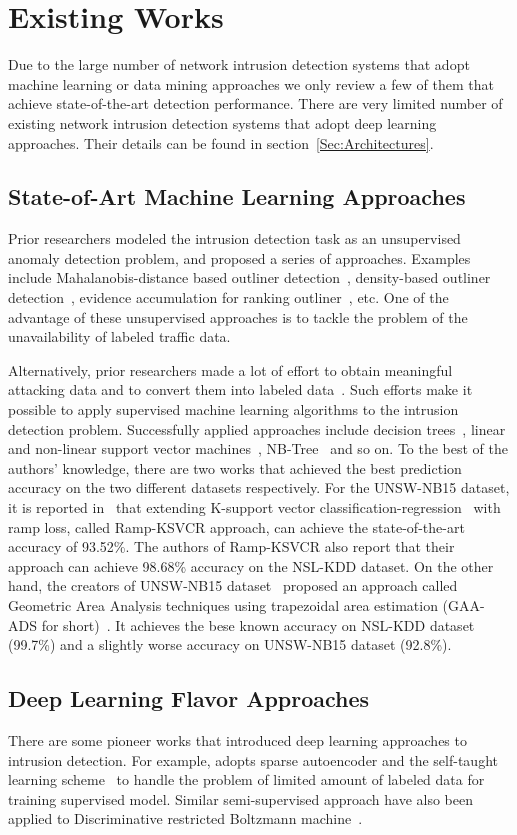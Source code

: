 \section{Existing Works}
Due to the large number of network intrusion detection systems that adopt machine learning or data mining approaches
we only review a few of them that achieve state-of-the-art detection performance.
There are very limited number of existing network intrusion detection systems that adopt
deep learning approaches.
Their details can be found in section~\ref{Sec:Architectures}.

\subsection{State-of-Art Machine Learning Approaches}
Prior researchers modeled the intrusion detection task as an unsupervised
anomaly detection problem, and proposed a series of approaches.
Examples include Mahalanobis-distance based outliner detection~\cite{ComparativeAnomalyNIDS},
density-based outliner detection~\cite{LOF, ComparativeAnomalyNIDS},
evidence accumulation for ranking outliner~\cite{RankingOutliner}, etc.
One of the advantage of these unsupervised approaches is to tackle the problem of
the unavailability of labeled traffic data.

Alternatively, prior researchers made a lot of effort to obtain meaningful
attacking data and to convert them into labeled data~\cite{DARPA, KDDCup, NSL-KDD, UNSW, UNSW1}.
Such efforts make it possible to apply supervised machine learning algorithms to the
intrusion detection problem.
Successfully applied approaches include decision trees~\cite{DecisionTree},
linear and non-linear support vector machines~\cite{SVM}, NB-Tree~\cite{NB-Tree} and so on.
To the best of the authors' knowledge, there are two works that achieved the best prediction
accuracy on the two different datasets respectively.
For the UNSW-NB15 dataset, it is reported in~\cite{RampLossKSVCR} that extending K-support vector
classification-regression~\cite{KSVCR} with ramp loss, called Ramp-KSVCR approach, can achieve the state-of-the-art accuracy of 93.52\%.
The authors of Ramp-KSVCR also report that their approach can achieve 98.68\% accuracy on the NSL-KDD dataset.
On the other hand, the creators of UNSW-NB15 dataset~\cite{UNSW} proposed an approach called
Geometric Area Analysis techniques using trapezoidal area estimation (GAA-ADS for short)~\cite{GAA-ADS}.
It achieves the bese known accuracy on NSL-KDD dataset (99.7\%) and a slightly worse accuracy on
UNSW-NB15 dataset (92.8\%).


\subsection{Deep Learning Flavor Approaches}
There are some pioneer works that introduced deep learning approaches to intrusion detection.
For example, \cite{STL-NIDS} adopts sparse autoencoder and the self-taught learning
scheme~\cite{SparseAE} to handle the problem of limited amount of labeled data for training supervised model.
Similar semi-supervised approach have also been applied to
Discriminative restricted Boltzmann machine~\cite{AnomalyDetectionRBM}.

